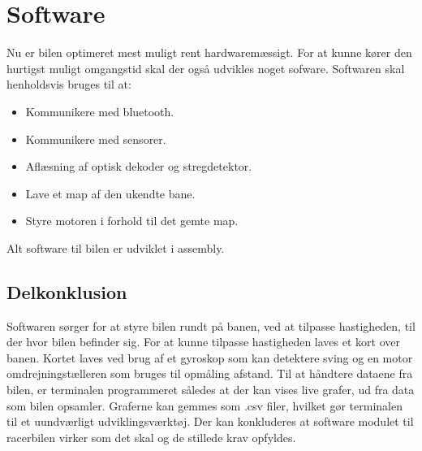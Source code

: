 
\section{Software}
Nu er bilen optimeret mest muligt rent hardwaremæssigt. For at kunne kører den hurtigst muligt omgangstid skal der også udvikles noget sofware. Softwaren skal henholdsvis bruges til at:
\begin{itemize}
\item Kommunikere med bluetooth.
\item Kommunikere med sensorer.
\item Aflæsning af optisk dekoder og stregdetektor.
\item Lave et map af den ukendte bane.
\item Styre motoren i forhold til det gemte map.
\end{itemize}
Alt software til bilen er udviklet i assembly.











\subsection{Delkonklusion}
Softwaren sørger for at styre bilen rundt på banen, ved at tilpasse hastigheden, til der hvor bilen befinder sig. For at kunne tilpasse hastigheden laves et kort over banen. Kortet laves ved brug af et gyroskop som kan detektere sving og en motor omdrejningstælleren som bruges til opmåling afstand. Til at håndtere dataene fra bilen, er terminalen programmeret således at der kan vises live grafer, ud fra data som bilen opsamler. Graferne kan gemmes som .csv filer, hvilket gør terminalen til et uundværligt udviklingsværktøj. Der kan konkluderes at software modulet til racerbilen virker som det skal og de stillede krav opfyldes. 